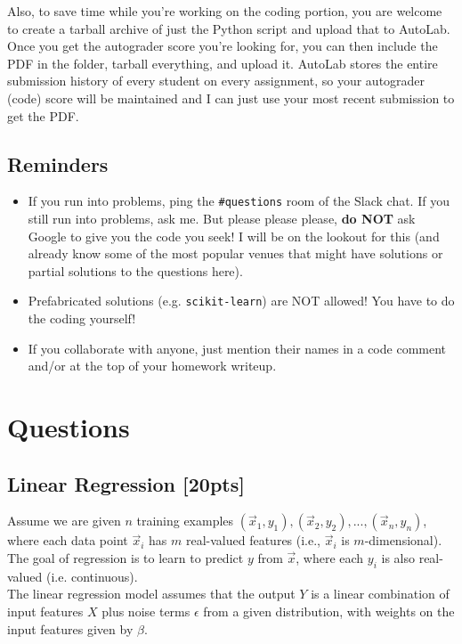 \documentclass[paper=a4, fontsize=11pt]{scrartcl} %
\numberwithin{figure}{section} %
\numberwithin{table}{section} %
\begin{document}
Also, to save time while you're working on the coding portion, you are welcome to create a tarball archive of just the Python script and upload that to AutoLab. Once you get the autograder score you're looking for, you can then include the PDF in the folder, tarball everything, and upload it. AutoLab stores the entire submission history of every student on every assignment, so your autograder (code) score will be maintained and I can just use your most recent submission to get the PDF.

\subsection{Reminders}

\begin{itemize}
	\item If you run into problems, ping the \texttt{\#questions} room of the Slack chat. If you still run into problems, ask me. But please please please, \textbf{do NOT} ask Google to give you the code you seek! I will be on the lookout for this (and already know some of the most popular venues that might have solutions or partial solutions to the questions here).
	\item Prefabricated solutions (e.g. \texttt{scikit-learn}) are NOT allowed! You have to do the coding yourself!
	\item If you collaborate with anyone, just mention their names in a code comment and/or at the top of your homework writeup.
\end{itemize}

\section*{Questions}
\setcounter{subsection}{0}

\subsection{Linear Regression \textbf{[20pts]}}

Assume we are given $n$ training examples $(\vec{x}_1, y_1), (\vec{x}_2, y_2), ..., (\vec{x}_n, y_n)$, where each data point $\vec{x}_i$ has $m$ real-valued features (i.e., $\vec{x}_i$ is $m$-dimensional). The goal of regression is to learn to predict $y$ from $\vec{x}$, where each $y_i$ is also real-valued (i.e. continuous). \\

The linear regression model assumes that the output $Y$ is a linear combination of input features $X$ plus noise terms $\epsilon$ from a given distribution, with weights on the input features given by $\beta$. \\
\end{document}
